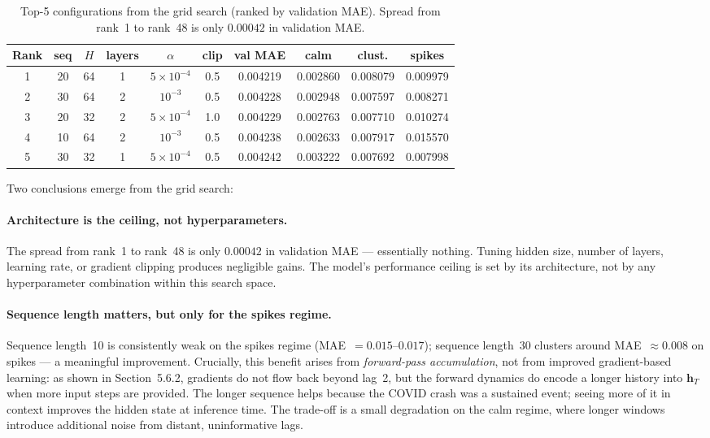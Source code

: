 \begin{table}[H]
  \centering
  \caption{Top-5 configurations from the grid search (ranked by validation
    MAE). Spread from rank~1 to rank~48 is only $0.00042$ in validation MAE.}
  \label{tab:rnn_gridsearch}
  \begin{tabular}{cccccccccc}
    \toprule
    Rank & seq & $H$ & layers & $\alpha$ & clip
         & val MAE & calm & clust. & spikes \\
    \midrule
    1 & 20 & 64 & 1 & $5{\times}10^{-4}$ & 0.5 & 0.004219 & 0.002860 & 0.008079 & 0.009979 \\
    2 & 30 & 64 & 2 & $10^{-3}$          & 0.5 & 0.004228 & 0.002948 & 0.007597 & 0.008271 \\
    3 & 20 & 32 & 2 & $5{\times}10^{-4}$ & 1.0 & 0.004229 & 0.002763 & 0.007710 & 0.010274 \\
    4 & 10 & 64 & 2 & $10^{-3}$          & 0.5 & 0.004238 & 0.002633 & 0.007917 & 0.015570 \\
    5 & 30 & 32 & 1 & $5{\times}10^{-4}$ & 0.5 & 0.004242 & 0.003222 & 0.007692 & 0.007998 \\
    \bottomrule
  \end{tabular}
\end{table}

Two conclusions emerge from the grid search:

\paragraph{Architecture is the ceiling, not hyperparameters.}
The spread from rank~1 to rank~48 is only $0.00042$ in validation MAE ---
essentially nothing.
Tuning hidden size, number of layers, learning rate, or gradient clipping
produces negligible gains. The model's performance ceiling is set by its
architecture, not by any hyperparameter combination within this search space.

\paragraph{Sequence length matters, but only for the spikes regime.}
Sequence length~10 is consistently weak on the spikes regime
(MAE~$= 0.015$--$0.017$); sequence length~30 clusters around
MAE~$\approx 0.008$ on spikes --- a meaningful improvement.
Crucially, this benefit arises from \emph{forward-pass accumulation}, not
from improved gradient-based learning: as shown in Section~5.6.2, gradients
do not flow back beyond lag~2, but the forward dynamics do encode a
longer history into $\mathbf{h}_T$ when more input steps are provided.
The longer sequence helps because the COVID crash was a sustained event;
seeing more of it in context improves the hidden state at inference time.
The trade-off is a small degradation on the calm regime, where longer
windows introduce additional noise from distant, uninformative lags.

